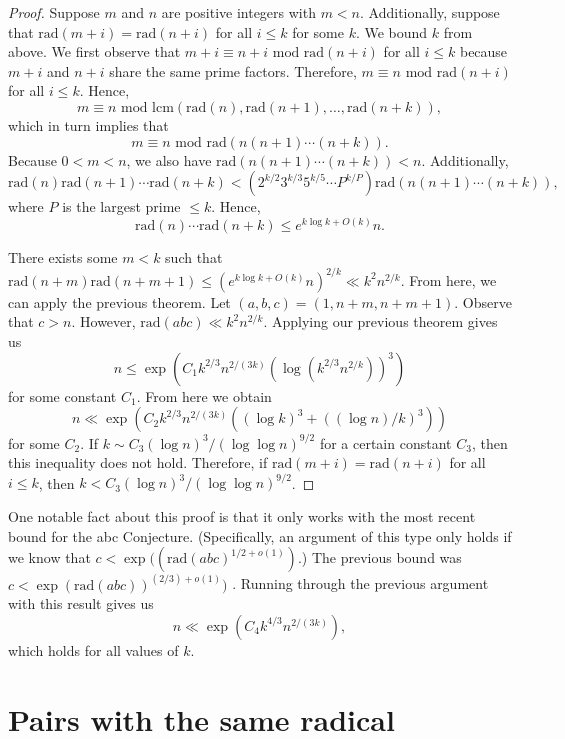 \documentclass{article}
\theoremstyle{plain}
\theoremstyle{definition}
\begin{document}
\begin{proof} Suppose $m$ and $n$ are positive integers with $m < n$. Additionally, suppose that $\textrm{rad} (m + i) = \textrm{rad} (n + i)$ for all $i \leq k$ for some $k$. We bound $k$ from above. We first observe that $m + i \equiv n + i \textrm{ mod rad} (n + i)$ for all $i \leq k$ because $m + i$ and $n + i$ share the same prime factors. Therefore, $m \equiv n \textrm{ mod rad} (n + i)$ for all $i \leq k$. Hence,
\[m \equiv n \textrm{ mod lcm} (\textrm{rad} (n), \textrm{rad} (n + 1), \ldots, \textrm{rad} (n + k)),\]
which in turn implies that
\[m \equiv n \textrm{ mod rad} (n(n + 1) \cdots (n + k)).\]
Because $0 < m < n$, we also have $\textrm{rad} (n(n + 1) \cdots (n + k)) < n$. Additionally,
\[\textrm{rad} (n) \textrm{rad} (n + 1) \cdots \textrm{rad} (n + k) < (2^{k/2} 3^{k/3} 5^{k/5} \cdots P^{k/P}) \textrm{rad} (n(n + 1) \cdots (n + k)),\]
where $P$ is the largest prime $\leq k$. Hence,
\[\textrm{rad} (n) \cdots \textrm{rad} (n + k) \leq e^{k \log k + O(k)} n.\]

There exists some $m < k$ such that $\textrm{rad} (n + m) \textrm{rad} (n + m + 1) \leq (e^{k \log k + O(k)} n)^{2/k} \ll k^2 n^{2/k}$. From here, we can apply the previous theorem. Let $(a, b, c) = (1, n + m, n + m + 1)$. Observe that $c > n$. However, $\textrm{rad}(abc) \ll k^2 n^{2/k}$. Applying our previous theorem gives us
\[n \leq \exp(C_1 k^{2/3} n^{2/(3k)} (\log (k^{2/3} n^{2/k}))^3)\]
for some constant $C_1$. From here we obtain
\[n \ll \exp(C_2 k^{2/3} n^{2/(3k)} ((\log k)^3 + ((\log n)/k)^3))\]
for some $C_2$. If $k \sim C_3 (\log n)^3/(\log \log n)^{9/2}$ for a certain constant $C_3$, then this inequality does not hold. Therefore, if $\textrm{rad} (m + i) = \textrm{rad} (n + i)$ for all $i \leq k$, then $k < C_3 (\log n)^3/(\log \log n)^{9/2}$.
\end{proof}

One notable fact about this proof is that it only works with the most recent bound for the abc Conjecture. (Specifically, an argument of this type only holds if we know that $c < \exp((\textrm{rad} (abc)^{1/2 + o(1)})$.) The previous bound was $c < \exp(\textrm{rad} (abc))^{(2/3) + o(1)})$ \cite{StY1}. Running through the previous argument with this result gives us
\[n \ll \exp(C_4 k^{4/3} n^{2/(3k)}),\]
which holds for all values of $k$.

\section{Pairs with the same radical}
\end{document}
